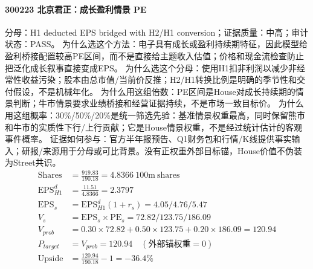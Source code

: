 \paragraph{300223 北京君正：成长盈利情景 PE}
分母：H1 deducted EPS bridged with H2/H1 conversion；证据质量：中高；审计状态：PASS。
为什么选这个方法：电子具有成长或盈利持续期特征，因此模型给盈利桥接配置较高PE区间，而不是直接给主题收入估值；价格和现金流检查防止把泛化成长叙事直接变成EPS。
为什么选这个分母：使用H1扣非利润以减少非经常性收益污染；股本由总市值/当前价反推；H2/H1转换比例是明确的季节性和交付假设，不是机械年化。
为什么用这组倍数：PE区间是House对成长持续期的情景判断；牛市情景要求业绩桥接和经营证据持续，不是市场一致目标价。
为什么用这组概率：30\%/50\%/20\%是统一筛选先验：基准情景权重最高，同时保留熊市和牛市的实质性下行/上行贡献；它是House情景权重，不是经过统计估计的客观事件概率。
证据如何参与：官方半年报预告、Q1财务包和行情/K线提供事实输入；研报/来源用于分母或可比背景。没有正权重外部目标锚，House价值不伪装为Street共识。
\begin{align*}
\mathrm{Shares} &= \frac{919.83}{190.18}=4.8366\ \mathrm{100m\ shares}\\
\mathrm{EPS}_{H1}^d &= \frac{11.51}{4.8366}=2.3797\\
\mathrm{EPS}_s &= \mathrm{EPS}_{H1}^d(1+r_s)=4.05/4.76/5.47\\
V_s &= \mathrm{EPS}_s\times \mathrm{PE}_s=72.82/123.75/186.09\\
V_{prob} &= 0.30\times 72.82+0.50\times 123.75+0.20\times 186.09=120.94\\
P_{target} &= V_{prob}=120.94\quad(\text{外部锚权重}=0)\\
\mathrm{Upside} &= \frac{120.94}{190.18}-1=-36.4\%\\
\end{align*}

